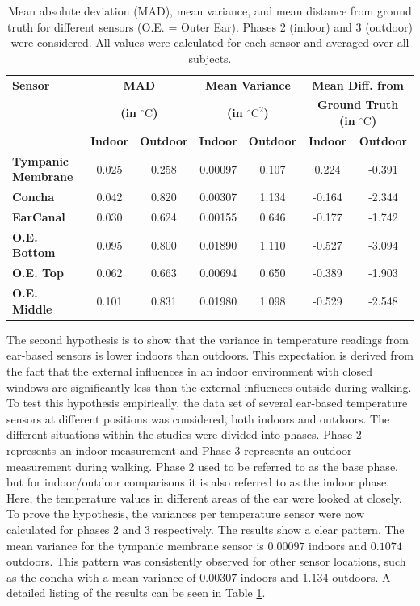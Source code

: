 \begin{table}[t]
\centering
\begin{tabular}{|p{2.5cm}|c|c|c|c|c|c|}
\hline
\textbf{Sensor} & \multicolumn{2}{c|}{\textbf{MAD}} & \multicolumn{2}{c|}{\textbf{Mean Variance}} & \multicolumn{2}{c|}{\textbf{Mean Diff. from}} \\
 & \multicolumn{2}{c|}{\textbf{(in \(^\circ\text{C}\))}} & \multicolumn{2}{c|}{\textbf{(in \(^\circ\text{C}^2\))}} & \multicolumn{2}{c|}{\textbf{Ground Truth (in \(^\circ\text{C}\))}} \\
\hline
 & \textbf{Indoor} & \textbf{Outdoor} & \textbf{Indoor} & \textbf{Outdoor} & \textbf{Indoor} & \textbf{Outdoor} \\
\hline
\textbf{Tympanic Membrane} & 0.025 & 0.258 & 0.00097 & 0.107 & 0.224 & -0.391 \\
\textbf{Concha} & 0.042 & 0.820 & 0.00307 & 1.134 & -0.164 & -2.344 \\
\textbf{EarCanal} & 0.030 & 0.624 & 0.00155 & 0.646 & -0.177 & -1.742 \\
\textbf{O.E. Bottom} & 0.095 & 0.800 & 0.01890 & 1.110 & -0.527 & -3.094 \\
\textbf{O.E. Top} & 0.062 & 0.663 & 0.00694 & 0.650 & -0.389 & -1.903 \\
\textbf{O.E. Middle} & 0.101 & 0.831 & 0.01980 & 1.098 & -0.529 & -2.548 \\
\hline
\end{tabular}
\caption{Mean absolute deviation (MAD), mean variance, and mean distance from ground truth for different sensors (O.E. = Outer Ear). Phases 2 (indoor) and 3 (outdoor) were considered. All values were calculated for each sensor and averaged over all subjects.}
\label{subsec:Evaluation:Study1:Hypothesis2:mean_variance_table}
\end{table}

The second hypothesis is to show that the variance in temperature readings from ear-based sensors is lower indoors than outdoors.
This expectation is derived from the fact that the external influences in an indoor environment with closed windows are significantly less than the external influences outside during walking.
To test this hypothesis empirically, the data set of several ear-based temperature sensors at different positions was considered, both indoors and outdoors.
The different situations within the studies were divided into phases. 
Phase 2 represents an indoor measurement and Phase 3 represents an outdoor measurement during walking.
Phase 2 used to be referred to as the base phase, but for indoor/outdoor comparisons it is also referred to as the indoor phase.
Here, the temperature values in different areas of the ear were looked at closely.
To prove the hypothesis, the variances per temperature sensor were now calculated for phases 2 and 3 respectively. 
The results show a clear pattern. 
The mean variance for the tympanic membrane sensor is $0.00097$ indoors and $0.1074$ outdoors.
This pattern was consistently observed for other sensor locations, such as the concha with a mean variance of $0.00307$ indoors and $1.134$ outdoors.
A detailed listing of the results can be seen in Table \ref{subsec:Evaluation:Study1:Hypothesis2:mean_variance_table}.

